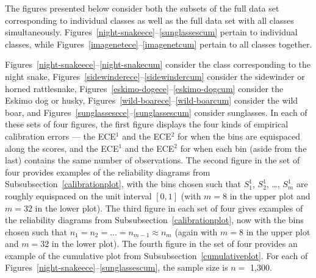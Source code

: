 \documentclass{article}
\begin{document}
The figures presented below consider both the subsets of the full data set
corresponding to individual classes as well as the full data set
with all classes simultaneously.
Figures~\ref{night-snakeece}--\ref{sunglassescum} pertain
to individual classes, while Figures~\ref{imagenetece}--\ref{imagenetcum}
pertain to all classes together.

Figures~\ref{night-snakeece}--\ref{night-snakecum} consider the class
corresponding to the night snake,
Figures~\ref{sidewinderece}--\ref{sidewindercum} consider
the sidewinder or horned rattlesnake,
Figures~\ref{eskimo-dogece}--\ref{eskimo-dogcum} consider
the Eskimo dog or husky,
Figures~\ref{wild-boarece}--\ref{wild-boarcum} consider the wild boar,
and Figures~\ref{sunglassesece}--\ref{sunglassescum} consider sunglasses.
In each of these sets of four figures,
the first figure displays the four kinds of empirical calibration errors ---
the ECE$^1$ and the ECE$^2$ for when the bins are equispaced along the scores,
and the ECE$^1$ and the ECE$^2$ for when each bin (aside from the last)
contains the same number of observations.
The second figure in the set of four provides examples
of the reliability diagrams from Subsubsection~\ref{calibrationplot},
with the bins chosen such that $S_1^1$, $S_2^1$, \dots, $S_m^1$
are roughly equispaced on the unit interval $[0, 1]$
(with $m = 8$ in the upper plot and $m = 32$ in the lower plot).
The third figure in each set of four gives examples
of the reliability diagrams from Subsubsection~\ref{calibrationplot},
now with the bins chosen such that $n_1 = n_2 = \dots = n_{m-1} \approx n_m$
(again with $m = 8$ in the upper plot and $m = 32$ in the lower plot).
The fourth figure in the set of four provides an example
of the cumulative plot from Subsubsection~\ref{cumulativeplot}.
For each of Figures~\ref{night-snakeece}--\ref{sunglassescum},
the sample size is $n =$ 1,300.
\end{document}
